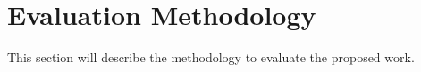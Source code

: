 \section{Evaluation Methodology}
\label{sec:Evaluation}
This section will describe the methodology to evaluate the proposed work. 
